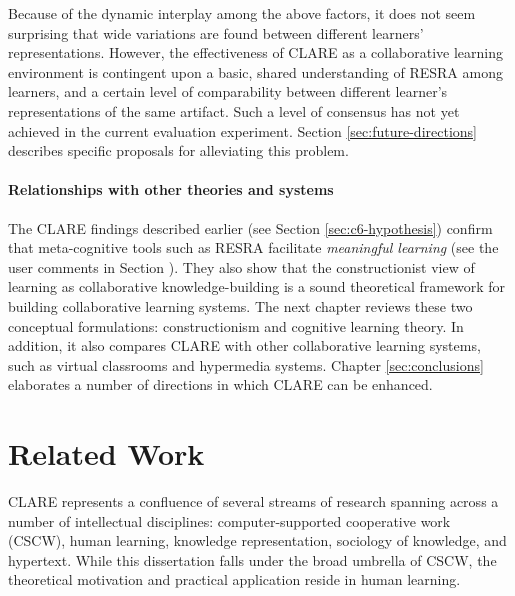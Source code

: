 Because of the dynamic interplay among the above factors, it does
not seem surprising that wide variations are found between different
learners' representations. However, the effectiveness of CLARE as a
collaborative learning environment is contingent upon a basic,
shared understanding of RESRA among learners, and a certain level of
comparability between different learner's representations of the same
artifact. Such a level of consensus has not yet achieved in the current
evaluation experiment. Section \ref{sec:future-directions} describes
specific proposals for alleviating this problem.


\subsubsection{Relationships with other theories and systems}

The CLARE findings described earlier (see Section \ref{sec:c6-hypothesis})
confirm that meta-cognitive tools such as RESRA facilitate {\it meaningful
learning\/} (see the user comments in Section ). They also show that the
constructionist view of learning as collaborative knowledge-building is a
sound theoretical framework for building collaborative learning
systems. The next chapter reviews these two conceptual formulations:
constructionism and cognitive learning theory. In addition, it also
compares CLARE with other collaborative learning systems, such as virtual
classrooms and hypermedia systems. Chapter \ref{sec:conclusions} elaborates
a number of directions in which CLARE can be enhanced.








\setcounter{chapter}{6}
\chapter{Related Work}
\label{sec:related work}


CLARE represents a confluence of several streams of research
spanning across a number of intellectual disciplines: computer-supported
cooperative work (CSCW), human learning, knowledge representation,
sociology of knowledge, and hypertext.  While this dissertation falls under
the broad umbrella of CSCW, the theoretical motivation and practical
application reside in human learning.

